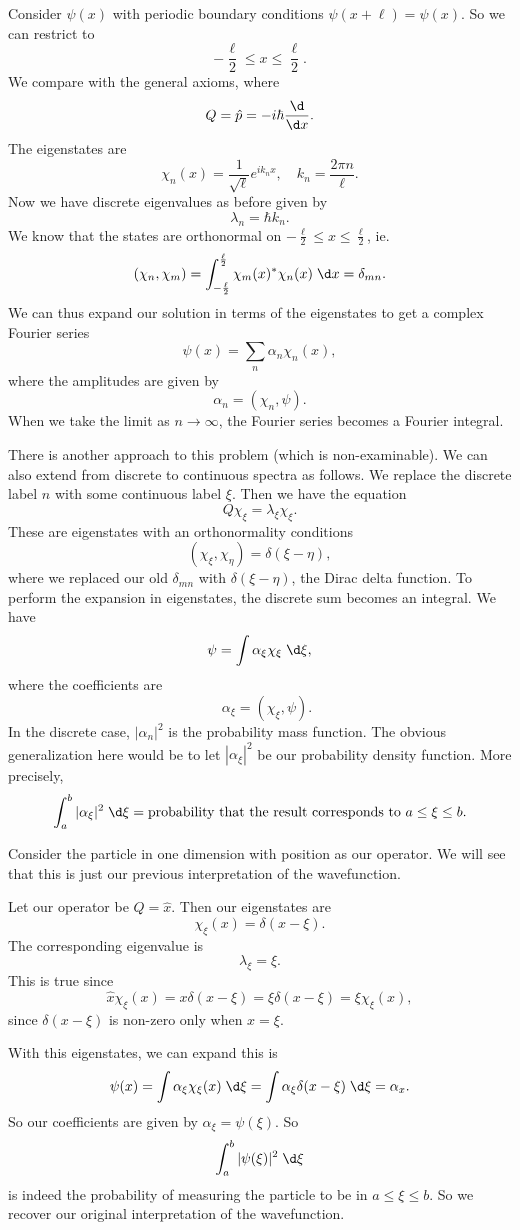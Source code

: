 \documentclass[a4paper]{article}
\begin{document}
\begin{eg}
  Consider $\psi(x)$ with periodic boundary conditions $\psi(x + \ell) = \psi(x)$. So we can restrict to
  \[
    -\frac{\ell}{2} \leq x \leq \frac{\ell}{2}.
  \]
  We compare with the general axioms, where
  \[
    Q = \hat{p} = -i\hbar \frac{\d}{\d x}.
  \]
  The eigenstates are
  \[
    \chi_n(x) = \frac{1}{\sqrt{\ell}} e^{i k_n x},\quad k_n = \frac{2\pi n}{\ell}.
  \]
  Now we have discrete eigenvalues as before given by
  \[
    \lambda_n = \hbar k_n.
  \]
  We know that the states are orthonormal on $-\frac{\ell}{2} \leq x \leq \frac{\ell}{2}$, ie.
  \[
    (\chi_n, \chi_m) = \int_{-\frac{\ell}{2}}^{\frac{\ell}{2}} \chi_m(x)^* \chi_n(x)\;\d x = \delta_{mn}.
  \]
  We can thus expand our solution in terms of the eigenstates to get a complex Fourier series
  \[
    \psi(x) = \sum_n \alpha_n \chi_n(x),
  \]
  where the amplitudes are given by
  \[
    \alpha_n = (\chi_n, \psi).
  \]
  When we take the limit as $n \to \infty$, the Fourier series becomes a Fourier integral.
\end{eg}

There is another approach to this problem (which is non-examinable). We can also extend from discrete to continuous spectra as follows. We replace the discrete label $n$ with some continuous label $\xi$. Then we have the equation
\[
  Q \chi_\xi = \lambda_\xi \chi_\xi.
\]
These are eigenstates with an orthonormality conditions
\[
  (\chi_\xi, \chi_\eta) = \delta(\xi - \eta),
\]
where we replaced our old $\delta_{mn}$ with $\delta(\xi - \eta)$, the Dirac delta function. To perform the expansion in eigenstates, the discrete sum becomes an integral. We have
\[
  \psi = \int \alpha_\xi \chi_\xi \;\d \xi,
\]
where the coefficients are
\[
  \quad \alpha_\xi = (\chi_\xi, \psi).
\]
In the discrete case, $|\alpha_n|^2$ is the probability mass function. The obvious generalization here would be to let $|\alpha_\xi|^2$ be our probability density function. More precisely,
\[
  \int_a^b |\alpha_\xi|^2 \;\d \xi = \text{probability that the result corresponds to }a \leq \xi \leq b.
\]
\begin{eg}
  Consider the particle in one dimension with position as our operator. We will see that this is just our previous interpretation of the wavefunction.

  Let our operator be $Q = \hat{x}$. Then our eigenstates are
  \[
    \chi_\xi (x) = \delta(x - \xi).
  \]
  The corresponding eigenvalue is
  \[
    \lambda_\xi = \xi.
  \]
  This is true since
  \[
    \hat{x} \chi_\xi(x) = x \delta (x - \xi) = \xi \delta(x - \xi) = \xi \chi_\xi(x),
  \]
  since $\delta(x - \xi)$ is non-zero only when $x = \xi$.

  With this eigenstates, we can expand this is
  \[
    \psi(x) = \int \alpha_\xi \chi_\xi(x)\;\d \xi = \int \alpha_\xi \delta(x - \xi) \;\d \xi = \alpha_x.
  \]
  So our coefficients are given by $\alpha_\xi = \psi(\xi)$. So
  \[
    \int_a^b |\psi(\xi)|^2 \;\d \xi
  \]
  is indeed the probability of measuring the particle to be in $a \leq \xi \leq b$. So we recover our original interpretation of the wavefunction.
\end{eg}
\end{document}
